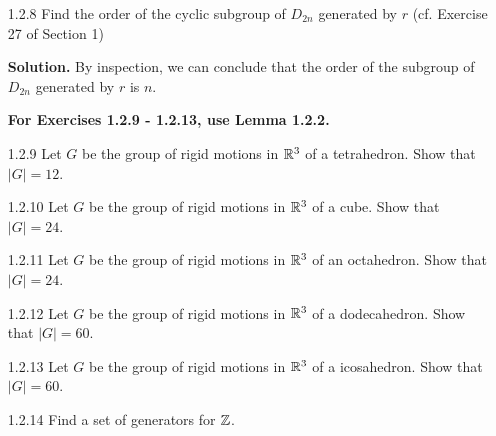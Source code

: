 \begin{enumerate}
      \textbf{Proof.} We already showed in Exercise 1.2.3 that $a$ and $b$
      generate $D_{2n}$, so first we want to show that the relations for $a$ and
      $b$ follow from that of $r$ and $s$. Since $s^2 = 1$ and since $a = s$, it
      follows that $a^2 = 1$. Also we have that $b^2 = (sr)^2 = 1$ by Exercise
      1.2.3. Now we have that $(ab)^n = (s(sr))^n = ((ss)r)^n = r^n = 1$.
      Conversely, we have that $s^2 = 1$ since $a^2 = 1$ and $s = a$. Also we
      have that $1 = (ab)^n = r^n$. Finally, since $srsr = 1$, it follows that
      $rsr = s^{-1} = s$, so that $rs = sr^{-1}$, as desired. \qed
   \item[1.2.8]   Find the order of the cyclic subgroup of $D_{2n}$ generated by
                  $r$ (cf. Exercise 27 of Section 1)
                  
      \textbf{Solution.} By inspection, we can conclude that the order of the
      subgroup of $D_{2n}$ generated by $r$ is $n$.
   \item[]        \textbf{For Exercises 1.2.9 - 1.2.13, use Lemma 1.2.2.}
   \item[1.2.9]   Let $G$ be the group of rigid motions in $\mathbb{R}^3$ of a
                  tetrahedron. Show that $|G| = 12$.
   \item[1.2.10]  Let $G$ be the group of rigid motions in $\mathbb{R}^3$ of a cube.
                  Show that $|G| = 24$.
   \item[1.2.11]  Let $G$ be the group of rigid motions in $\mathbb{R}^3$ of an
                  octahedron. Show that $|G| = 24$.
   \item[1.2.12]  Let $G$ be the group of rigid motions in $\mathbb{R}^3$ of a
                  dodecahedron. Show that $|G| = 60$.
   \item[1.2.13]  Let $G$ be the group of rigid motions in $\mathbb{R}^3$ of a
                  icosahedron. Show that $|G| = 60$.
   \item[1.2.14]  Find a set of generators for $\mathbb{Z}$.
   

\end{enumerate}

